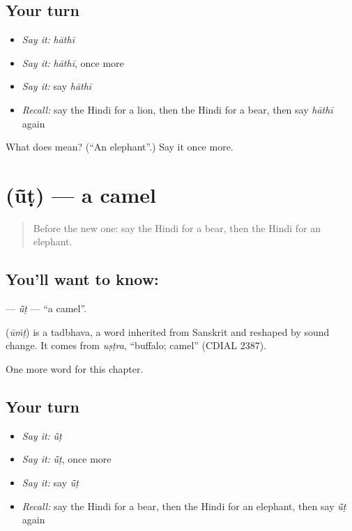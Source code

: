 \subsection*{Your turn}
\begin{itemize}
\raggedright
  \item \emph{Say it:} \emph{hāthī}
  \item \emph{Say it:} \emph{hāthī}, once more
  \item \emph{Say it:} say \emph{hāthī}
  \item \emph{Recall:} say the Hindi for a lion, then the Hindi for a bear, then say \emph{hāthī} again
\end{itemize}

\begin{tcolorbox}[breakable,colback=teal!4,colframe=teal!35!black,title={Before you move on}]
What does  mean? (\textquotedblleft{}An elephant\textquotedblright{}.) Say it once more.
\end{tcolorbox}
\section[\texorpdfstring{\hi{ऊँट} (ū̃ṭ)}{ऊँट (ū̃ṭ)}]{ (ū̃ṭ) — a camel}

\label{lesson:HI-C146-ut}



\begin{quote}
Before the new one: say the Hindi for a bear, then the Hindi for an elephant.
\end{quote}

\subsection*{You'll want to know: }
\textbf{} — \emph{ū̃ṭ} — \textquotedblleft{}a camel\textquotedblright{}.

\begin{cousinweb}
\textbf{} (\emph{ūṁṭ}) is a tadbhava, a word inherited from Sanskrit and reshaped by sound change. It comes from \emph{uṣṭra}, \textquotedblleft{}buffalo; camel\textquotedblright{} (CDIAL 2387).
\end{cousinweb}

\begin{grammarlens}[title={What you've built}]
One more word for this chapter.
\end{grammarlens}

\subsection*{Your turn}
\begin{itemize}
\raggedright
  \item \emph{Say it:} \emph{ū̃ṭ}
  \item \emph{Say it:} \emph{ū̃ṭ}, once more
  \item \emph{Say it:} say \emph{ū̃ṭ}
  \item \emph{Recall:} say the Hindi for a bear, then the Hindi for an elephant, then say \emph{ū̃ṭ} again
\end{itemize}

